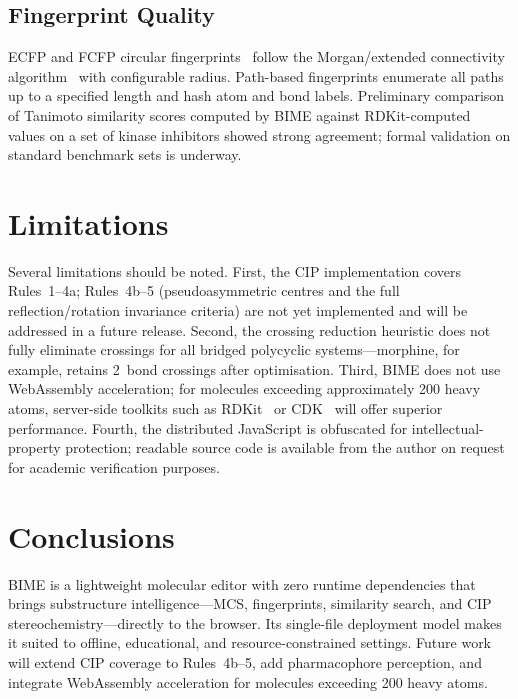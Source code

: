 \documentclass[twocolumn]{article}
\begin{document}
\subsection{Fingerprint Quality}

ECFP and FCFP circular fingerprints~\citep{Rogers2010} follow the
Morgan/extended connectivity algorithm~\citep{Morgan1965} with
configurable radius.  Path-based fingerprints enumerate all paths up to
a specified length and hash atom and bond labels.  Preliminary
comparison of Tanimoto similarity scores computed by BIME against
RDKit-computed values on a set of kinase inhibitors showed strong
agreement; formal validation on standard benchmark sets is underway.

\section{Limitations}
\label{sec:limitations}

Several limitations should be noted.  First, the CIP implementation
covers Rules~1--4a; Rules~4b--5 (pseudoasymmetric centres and the
full reflection/rotation invariance criteria) are not yet implemented
and will be addressed in a future release.  Second, the crossing
reduction heuristic does not fully eliminate crossings for all bridged
polycyclic systems---morphine, for example, retains 2~bond crossings
after optimisation.  Third, BIME does not use WebAssembly acceleration;
for molecules exceeding approximately 200 heavy atoms, server-side
toolkits such as RDKit~\citep{Landrum2006} or
CDK~\citep{Steinbeck2003} will offer superior performance.  Fourth, the
distributed JavaScript is obfuscated for intellectual-property
protection; readable source code is available from the author on
request for academic verification purposes.

\section{Conclusions}

BIME is a lightweight molecular editor with zero runtime dependencies
that brings substructure intelligence---MCS, fingerprints, similarity
search, and CIP stereochemistry---directly to the browser.  Its
single-file deployment model makes it suited to offline, educational,
and resource-constrained settings.  Future work will extend CIP coverage
to Rules~4b--5, add pharmacophore perception, and integrate WebAssembly
acceleration for molecules exceeding 200 heavy atoms.
\end{document}
